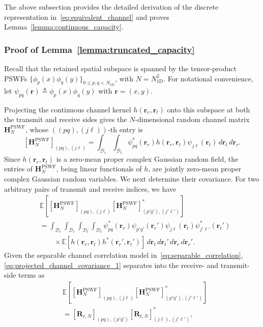 \documentclass[lettersize,journal]{IEEEtran}
\theoremstyle{plain}
\begin{document}
The above subsection provides the detailed derivation of the discrete representation in~\eqref{eq:equivalent_channel} and proves Lemma~\ref{lemma:continuous_capacity}.

\subsubsection{Proof of Lemma~\ref{lemma:truncated_capacity}}

Recall that the retained spatial subspace is spanned by the
tensor-product PSWFs
$\{\phi_p(x)\phi_q(y)\}_{0\leq p,q<N_{\mathrm{1D}}}$,
with $N=N_{\mathrm{1D}}^2$. For notational convenience, let $\psi_{pq}(\mathbf r)
\triangleq
\phi_p(x)\phi_q(y)$ with $\mathbf{r} = (x, y)$.

Projecting the continuous channel kernel
$h(\mathbf r_r,\mathbf r_t)$ onto this subspace at both the
transmit and receive sides gives the $N$-dimensional random
channel matrix $\mathbf H_N^{\mathrm{PSWF}}$, whose
$((pq),(j\ell))$-th entry is
$$
	\label{eq:projected_channel_element}
	[\mathbf H_N^\mathrm{PSWF}]_{(pq),(j\ell)}
	=
	\int_{\mathcal D_r}
	\int_{\mathcal D_t}
	\psi_{pq}^{*}(\mathbf r_r)
	h(\mathbf r_r,\mathbf r_t)
	\psi_{j\ell}(\mathbf r_t)
	\,d\mathbf r_t\,d\mathbf r_r .
$$
Since $h(\mathbf r_r,\mathbf r_t)$ is a zero-mean proper complex Gaussian random field, the entries of $\mathbf H_N^{\mathrm{PSWF}}$, being linear functionals of $h$,
are jointly zero-mean proper complex Gaussian random variables. We next determine their covariance. For two arbitrary pairs of
transmit and receive indices, we have
\begin{align}
	&\mathbb E\!
	\left[
	[\mathbf H_N^{\mathrm{PSWF}}]_{(pq),(j\ell)}
	[\mathbf H_N^{\mathrm{PSWF}}]_{(p'q'),(j'\ell')}^{*}
	\right]
	\nonumber\\
	&=
	\int_{\mathcal D_r}
	\int_{\mathcal D_r}
	\int_{\mathcal D_t}
	\int_{\mathcal D_t}
	\psi_{pq}^{*}(\mathbf r_r)
	\psi_{p'q'}(\mathbf r_r')
	\psi_{j\ell}(\mathbf r_t)
	\psi_{j'\ell'}^{*}(\mathbf r_t')
	\nonumber\\
	&\qquad\times
	\mathbb E
	\left[
	h(\mathbf r_r,\mathbf r_t)
	h^{*}(\mathbf r_r',\mathbf r_t')
	\right]
	\,d\mathbf r_t\,d\mathbf r_t'\,
	d\mathbf r_r\,d\mathbf r_r'.
	\label{eq:projected_channel_covariance_1}
\end{align}
Given the separable channel correlation model in~\eqref{eq:separable_correlation}, \eqref{eq:projected_channel_covariance_1} separates
into the receive- and transmit-side terms as
\begin{align}
	&\mathbb E\!
	\left[
	[\mathbf H_N^{\mathrm{PSWF}}]_{(pq),(j\ell)}
	[\mathbf H_N^{\mathrm{PSWF}}]_{(p'q'),(j'\ell')}^{*}
	\right]
	\nonumber\\
	&= 
	[\mathbf R_{r,N}]_{(pq),(p'q')}
	[\mathbf R_{t,N}]_{(j\ell),(j'\ell')}^{*},
	\label{eq:projected_channel_covariance_2}
\end{align}
\end{document}
